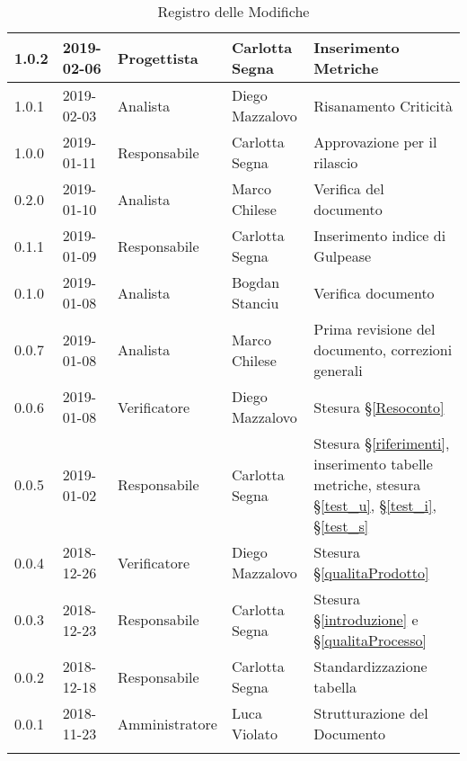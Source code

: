 \begin{center}
\begin{longtable}[c]{|m{}|m{}|m{}|m{}|p{}|}
\hline
1.0.2 & 2019-02-06 & Progettista & Carlotta Segna & Inserimento Metriche \\
\hline
\rowcolor{grigio}1.0.1 & 2019-02-03 & Analista & Diego Mazzalovo & Risanamento Criticità \\
\hline 
1.0.0 & 2019-01-11 & Responsabile & Carlotta Segna & Approvazione per il rilascio\\
\hline
\rowcolor{grigio}0.2.0 & 2019-01-10 & Analista & Marco Chilese & Verifica del documento\\
\hline
0.1.1 & 2019-01-09 & Responsabile & Carlotta Segna & Inserimento indice di Gulpease \\
\hline
\rowcolor{grigio}0.1.0 & 2019-01-08 &  Analista & Bogdan Stanciu & Verifica documento \\
\hline
0.0.7 & 2019-01-08 & Analista & Marco Chilese & Prima revisione del documento, correzioni generali\\
\hline
\rowcolor{grigio}0.0.6 & 2019-01-08 & Verificatore & Diego Mazzalovo & Stesura §\ref{Resoconto}\\
\hline
0.0.5 & 2019-01-02 & Responsabile & Carlotta Segna & Stesura §\ref{riferimenti}, inserimento tabelle metriche, stesura §\ref{test_u}, §\ref{test_i}, §\ref{test_s} \\
\hline
\rowcolor{grigio} 0.0.4 & 2018-12-26 & Verificatore & Diego Mazzalovo  & Stesura §\ref{qualitaProdotto} \\
\hline
0.0.3 & 2018-12-23 & Responsabile  & Carlotta Segna & Stesura §\ref{introduzione} e §\ref{qualitaProcesso} \\
\hline
\rowcolor{grigio} 0.0.2 & 2018-12-18 & Responsabile & Carlotta Segna & Standardizzazione tabella \\
\hline
0.0.1 & 2018-11-23 & Amministratore & Luca Violato & Strutturazione del Documento \\

\hline
\caption{Registro delle Modifiche}
\end{longtable}
\end{center}